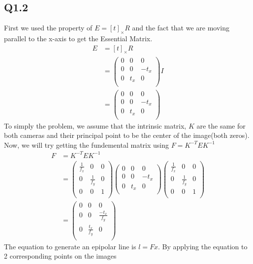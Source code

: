 \documentclass{article}
\begin{document}
\subsection*{Q1.2}
First we used the property of $E = [t]_{\times} R$ and the fact that we are moving parallel to the x-axis to get the Essential Matrix.
\begin{equation*}
\begin{aligned}
E &= [t]_{\times} R\\
&=
\begin{pmatrix}
0& 0 & 0\\
0& 0 & -t_x\\
0& t_x & 0\\
\end{pmatrix} I\\
&=
\begin{pmatrix}
0& 0 & 0\\
0& 0 & -t_x\\
0& t_x & 0\\
\end{pmatrix}
\end{aligned}
\end{equation*}
To simply the problem, we assume that the intrinsic matrix, $K$ are the same for both cameras and their principal point to be the center of the image(both zeros). Now, we will try getting the fundemental matrix using $F = K^{-T}EK^{-1}$
\begin{equation*}
\begin{aligned}
F &= K^{-T}EK^{-1}\\
&=
\begin{pmatrix}
\frac{1}{f_x} &0 &0\\
0 & \frac{1}{f_y}&0\\
0 & 0 &1\\
\end{pmatrix}
\begin{pmatrix}
0& 0 & 0\\
0& 0 & -t_x\\
0& t_x & 0\\
\end{pmatrix}
\begin{pmatrix}
\frac{1}{f_x} &0 &0\\
0 & \frac{1}{f_y}&0\\
0 & 0 & 1\\
\end{pmatrix}\\
&=
\begin{pmatrix}
0& 0 & 0\\
0& 0 & \frac{-t_x}{f_y}\\
0& \frac{t_x}{f_y} & 0\\
\end{pmatrix}
\end{aligned}
\end{equation*}
The equation to generate an epipolar line is $l = Fx$. By applying the equation to 2 corresponding points on the images
\end{document}
